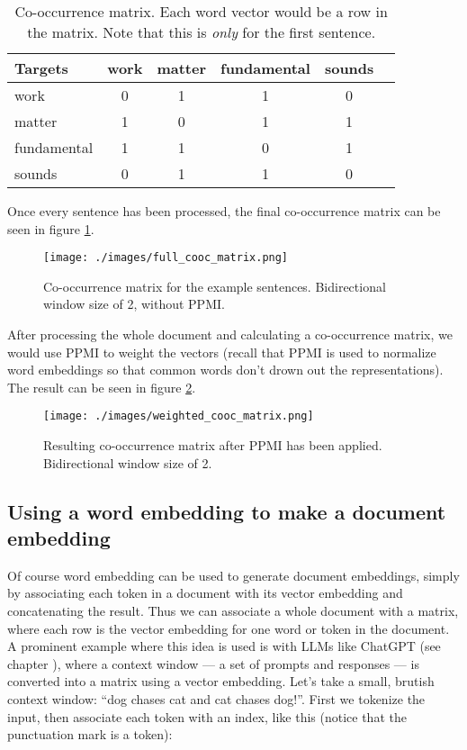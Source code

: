 \begin{table}[h]
    \centering
    \begin{tabular}{|l|c|c|c|c|c|}
    \hline
    Targets & work & matter & fundamental & sounds \\
    \hline
    work & 0 & 1 & 1 & 0 \\
    \hline
    matter & 1 & 0 & 1 & 1  \\
    \hline
    fundamental & 1 & 1 & 0 & 1  \\
    \hline
    sounds & 0 & 1 & 1 & 0  \\
    \hline
    \end{tabular}
    \caption{Co-occurrence matrix. Each word vector would be a row in the matrix. Note that this is \textit{only} for the first sentence.}
    \label{exampleCoocmat}
\end{table}

Once every sentence has been processed, the final co-occurrence matrix can be seen in figure \ref{coocExample}.

\begin{figure}[h]
    \centering
    \texttt{[image: ./images/full\_cooc\_matrix.png]}
    \caption[Generated using Simbrain.]{Co-occurrence matrix for the example sentences. Bidirectional window size of 2, without PPMI.}
 \label{coocExample}
\end{figure}

After processing the whole document and calculating a co-occurrence matrix, we would use PPMI to weight the vectors (recall that PPMI is used to normalize word embeddings so that common words don't drown out the representations). The result can be seen in figure \ref{ppmiExample}.

\begin{figure}[h]
    \centering
    \texttt{[image: ./images/weighted\_cooc\_matrix.png]}
    \caption[Generated using Simbrain.]{Resulting co-occurrence matrix after PPMI has been applied. Bidirectional window size of 2.}
 \label{ppmiExample}
\end{figure}

\subsection{Using a word embedding to make a document embedding}\label{wordEmbeddingMatrix}

Of course word embedding can be used to generate document embeddings, simply by associating each token in a document with its vector embedding and concatenating the result. Thus we can associate a whole document with a matrix, where each row is the vector embedding for one word or token in the document. A prominent example where this idea is used is with LLMs like ChatGPT (see chapter ), where a context window --- a set of prompts and responses --- is converted into a matrix using a vector embedding. Let's take a small, brutish context window:  ``dog chases cat and cat chases dog!''.  First we tokenize the input, then associate each token with an index, like this (notice that the punctuation mark is a token):


